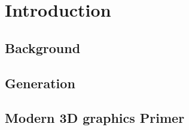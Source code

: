 \chapter{Introduction}




\section{Background}


\section{Generation}


\section{Modern 3D graphics Primer}




